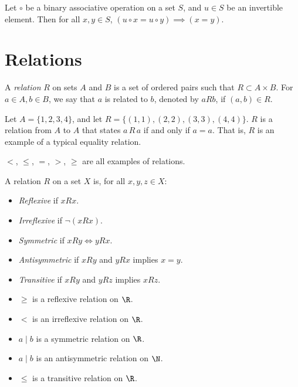 \documentclass[12pt]{article}
\begin{document}
\begin{cor}
    Let $\circ$ be a binary associative operation on a set $S$, and $u \in S$ be an invertible element. Then for all $x, y \in S$, $(u \circ x = u \circ y) \implies (x = y)$.
\end{cor}

\section{Relations}

\begin{defn}
    A \emph{relation} $R$ on sets $A$ and $B$ is a set of ordered pairs such that $R \subset A \times B$. For $a \in A, b \in B$, we say that $a$ is related to $b$, denoted by $a R b$, if $(a, b) \in R$.
\end{defn}

\begin{exmp}
    Let $A = \{1, 2, 3, 4\}$, and let $R = \{(1, 1), (2, 2), (3, 3), (4, 4)\}$. $R$ is a relation from $A$ to $A$ that states $a \,R\, a$ if and only if $a = a$. That is, $R$ is an example of a typical equality relation.
\end{exmp}

\begin{exmp}
    $<$, $\leq$, $=$, $>$, $\geq$ are all examples of relations.
\end{exmp}

\begin{defn}
    A relation $R$ on a set $X$ is, for all $x, y, z \in X$:
    \begin{itemize}
        \item \emph{Reflexive} if $x R x$.
        \item \emph{Irreflexive} if $\neg(x R x)$.
        \item \emph{Symmetric} if $x R y \iff y R x$.
        \item \emph{Antisymmetric} if $x R y$ and $y R x$ implies $x = y$.
        \item \emph{Transitive} if $x R y$ and $y R z$ implies $x R z$.
    \end{itemize}
\end{defn}

\begin{exmp}\proofbreak
    \begin{itemize}
        \item $\geq$ is a reflexive relation on $\R$.
        \item $<$ is an irreflexive relation on $\R$.
        \item $a \mid b$ is a symmetric relation on $\R$.
        \item $a \mid b$ is an antisymmetric relation on $\N$.
        \item $\leq$ is a transitive relation on $\R$.
    \end{itemize}
\end{exmp}
\end{document}
